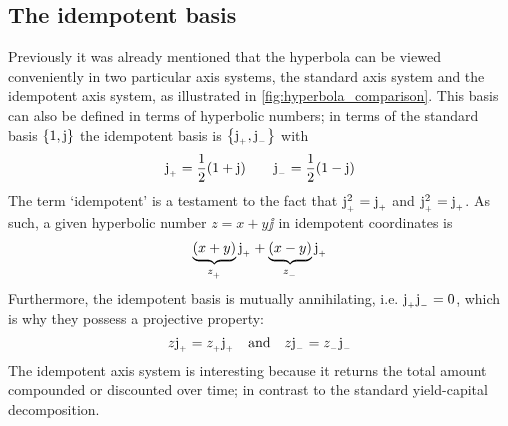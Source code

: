 \subsection{The idempotent basis}
Previously it was already mentioned that the hyperbola can be viewed conveniently in two particular axis systems, the standard axis system and the idempotent axis system, as illustrated in \cref{fig:hyperbola_comparison}. This basis can also be defined in terms of hyperbolic numbers; in terms of the standard basis \(\qty{1, \ensuremath{\mathrm{j}}}\) the idempotent basis is \(\qty{\ensuremath{\mathrm{j}_{_+}}, \ensuremath{\mathrm{j}_{_-}}}\) with 
\[
     \mathrm{j}_{_+} = \frac{1}{2}(1 + \mathrm{j}) \qquad \mathrm{j}_{_-} = \frac{1}{2}(1 - \mathrm{j})
\]
The term `idempotent' is a testament to the fact that \(\mathrm{j}_{_+}^2 = \mathrm{j}_{_+}\) and \(\mathrm{j}_{_+}^2 = \mathrm{j}_{_+}\). As such, a given hyperbolic number \(z = x + y\jj\) in idempotent coordinates is 
\[
     \underbrace{\qty(x + y)}_{z_{_+}}\mathrm{j}_{_+} + \underbrace{\qty(x - y)}_{z_{_-}}\mathrm{j}_{_+}
\]
Furthermore, the idempotent basis is mutually annihilating, i.e. \(\mathrm{j}_{_+} \mathrm{j}_{_-} = 0\), which is why they possess a projective property: \cite{Sobczyk1995}
\[
     z\mathrm{j}_{_+} = z_{_+}\mathrm{j}_{_+}\quad\text{and}\quad z\mathrm{j}_{_-} = z_{_-}\mathrm{j}_{_-}
\]
The idempotent axis system is interesting because it returns the total amount compounded or discounted over time; in contrast to the standard yield-capital decomposition.

